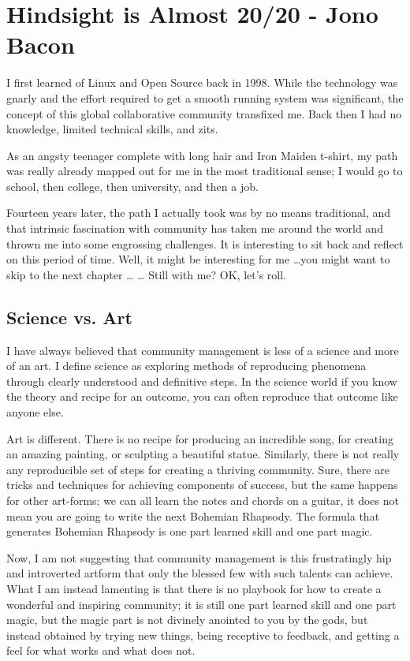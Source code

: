 \chapter{Hindsight is Almost 20/20 - Jono Bacon}
I first learned of Linux and Open Source back in 1998. While the technology was gnarly and the effort required to get a smooth running system was significant, the concept of this global collaborative community transfixed me. Back then I had no knowledge, limited technical skills, and zits.

As an angsty teenager complete with long hair and Iron Maiden t-shirt, my path was really already mapped out for me in the most traditional sense; I would go to school, then college, then university, and then a job.

Fourteen years later, the path I actually took was by no means traditional, and that intrinsic fascination with community has taken me around the world and thrown me into some engrossing challenges. It is interesting to sit back and reflect on this period of time. Well, it might be interesting for me \dots you might want to skip to the next chapter \dots 
\newline
\dots
\newline
Still with me? OK, let’s roll.

\section*{Science vs. Art}

I have always believed that community management is less of a science and more of an art. I define science as exploring methods of reproducing phenomena through clearly understood and definitive steps. In the science world if you know the theory and recipe for an outcome, you can often reproduce that outcome like anyone else.

Art is different. There is no recipe for producing an incredible song, for creating an amazing painting, or sculpting a beautiful statue. Similarly, there is not really any reproducible set of steps for creating a thriving community. Sure, there are tricks and techniques for achieving components of success, but the same happens for other art-forms; we can all learn the notes and chords on a guitar, it does not mean you are going to write the next Bohemian Rhapsody. The formula that generates Bohemian Rhapsody is one part learned skill and one part magic.

Now, I am not suggesting that community management is this frustratingly hip and introverted artform that only the blessed few with such talents can achieve. What I am instead lamenting is that there is no playbook for how to create a wonderful and inspiring community; it is still one part learned skill and one part magic, but the magic part is not divinely anointed to you by the gods, but instead obtained by trying new things, being receptive to feedback, and getting a feel for what works and what does not.

